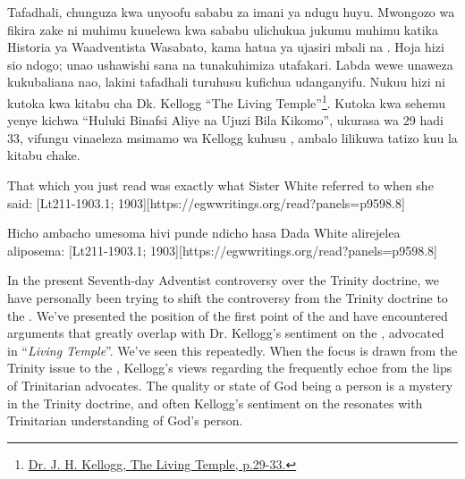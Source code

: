 Tafadhali, chunguza kwa unyoofu sababu za imani ya ndugu huyu. Mwongozo wa fikira zake ni muhimu kuuelewa kwa sababu ulichukua jukumu muhimu katika Historia ya Waadventista Wasabato, kama hatua ya ujasiri mbali na . Hoja hizi sio ndogo; unao ushawishi sana na tunakuhimiza utafakari. Labda wewe unaweza kukubaliana nao, lakini tafadhali turuhusu kufichua udanganyifu. Nukuu hizi ni kutoka kwa kitabu cha Dk. Kellogg “The Living Temple”\footnote{\href{https://archive.org/details/J.H.Kellogg.TheLivingTemple1903}{Dr. J. H. Kellogg, The Living Temple, p.29-33.}}. Kutoka kwa sehemu yenye kichwa “Huluki Binafsi Aliye na Ujuzi Bila Kikomo”, ukurasa wa 29 hadi 33, vifungu vinaeleza msimamo wa Kellogg kuhusu , ambalo lilikuwa tatizo kuu la kitabu chake.


That which you just read was exactly what Sister White referred to when she said: [Lt211-1903.1; 1903][https://egwwritings.org/read?panels=p9598.8]


Hicho ambacho umesoma hivi punde ndicho hasa Dada White alirejelea aliposema: [Lt211-1903.1; 1903][https://egwwritings.org/read?panels=p9598.8]


In the present Seventh-day Adventist controversy over the Trinity doctrine, we have personally been trying to shift the controversy from the Trinity doctrine to the . We’ve presented the position of the first point of the  and have encountered arguments that greatly overlap with Dr. Kellogg’s sentiment on the , advocated in “\textit{Living Temple}”. We’ve seen this repeatedly. When the focus is drawn from the Trinity issue to the , Kellogg’s views regarding the  frequently echoe from the lips of Trinitarian advocates. The quality or state of God being a person is a mystery in the Trinity doctrine, and often Kellogg’s sentiment on the  resonates with Trinitarian understanding of God’s person.


